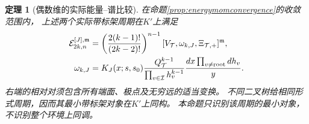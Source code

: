 \documentclass[11pt,a4paper]{ctexart}
\theoremstyle{cnplain}\newtheorem{theorem}{定理}[section]
\theoremstyle{definition}\newtheorem{definition}[theorem]{定义}
\theoremstyle{remark}\newtheorem{remark}[theorem]{注}
\begin{document}
\begin{theorem}[偶数维的实际能量--谱比较]\label{thm:actualevenenergy}
在命题\ref{prop:energymomconvergence}的收敛范围内，
上述两个实际带标架周期在$K'$上满足
\begin{align}\label{eq:actualevenenergy}
 \mathcal E_{2k,n}^{[J],\mathfrak m}
 &=\left(\frac{2(k-1)!}{(2k-2)!}\right)^{n-1}
       [V_{\mathcal T},\omega_{k,J},\Xi_{\mathcal T,+}]^{\mathfrak m},\\
 \omega_{k,J}
 &=K_J(x;s,s_0)
    \frac{Q_{\mathcal T}^{k-1}}{\prod_{v\in\mathcal I}h_v^{k-1}}
    \frac{dx\prod_{v\ne{\rm root}}dh_v}{y}.\nonumber
\end{align}
右端的相对对须包含所有端面、极点及无穷远的适当变换。
不同二叉树给相同形式周期，因而其最小带标架对象在$K'$上同构。
本命题只识别该周期的最小对象，不识别整个环境上同调。
\end{theorem}
\end{document}
